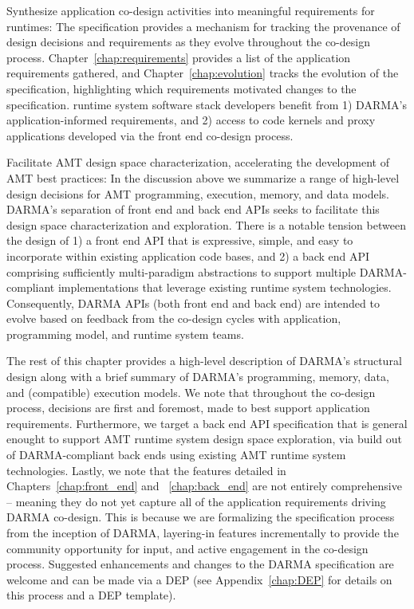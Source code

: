 \begin{compactdesc}
\item[Synthesize application co-design activities into meaningful requirements
  for runtimes:]
  The specification provides a mechanism for tracking the
  provenance of design decisions and requirements as they evolve throughout the
  \gls{co-design} process. Chapter~\ref{chap:requirements} provides a list of the application
  requirements gathered,  and Chapter~\ref{chap:evolution} tracks the evolution of
  the specification, highlighting which requirements motivated changes to the specification.
  \Gls{runtime system} software stack developers benefit 
  from 1) \gls{DARMA}’s application-informed requirements, and 2) access to code
  kernels and proxy applications developed via the \gls{front end}
  \gls{co-design} process.
\item[Facilitate AMT design space characterization, accelerating the
development of AMT best practices:]
  In the discussion above we summarize a range of high-level design decisions for
  \gls{AMT} programming, execution, memory, and data models. \gls{DARMA}'s
  separation of \gls{front end} and \gls{back end} \glspl{API} seeks to
  facilitate this design space characterization and exploration.  There 
  is a notable tension between the design of 1) a \gls{front end} \gls{API} that is expressive, simple, 
  and easy to incorporate within existing application code bases, and 2) a
  \gls{back end} \gls{API} comprising sufficiently multi-paradigm abstractions 
  to support multiple \gls{DARMA}-compliant implementations that leverage existing \gls{runtime
  system} technologies. 
  Consequently, \gls{DARMA} \gls{API}s (both \gls{front end} and \gls{back end}) are
  intended to evolve based on feedback from the \gls{co-design} cycles with 
  application, \gls{programming model}, and \gls{runtime system} teams. 
\end{compactdesc}


The rest of this chapter provides a high-level description of 
\gls{DARMA}'s structural design  along with a brief summary of \gls{DARMA}'s programming,
memory, data, and (compatible) execution models. We note that throughout the
\gls{co-design} process, decisions are first and foremost, 
made to best support application requirements.  Furthermore, we target a
\gls{back end} \gls{API} specification that is general enought to support 
\gls{AMT} \gls{runtime system}
design space exploration, via build out of \gls{DARMA}-compliant
back ends using existing \gls{AMT} \gls{runtime system}
technologies.
Lastly, we note that the features detailed in Chapters~\ref{chap:front_end} and
~\ref{chap:back_end}  are not entirely comprehensive -- meaning they do not yet capture all of the
application requirements driving \gls{DARMA} \gls{co-design}.  This is because 
we are formalizing the specification process from the inception of \gls{DARMA}, layering-in features incrementally to
provide the community opportunity for input, and active engagement in the
\gls{co-design} process.  Suggested enhancements and changes 
to the \gls{DARMA} specification are welcome and can be made via a \gls{DEP} (see
Appendix~\ref{chap:DEP} for details on this process and a \gls{DEP} template). 

